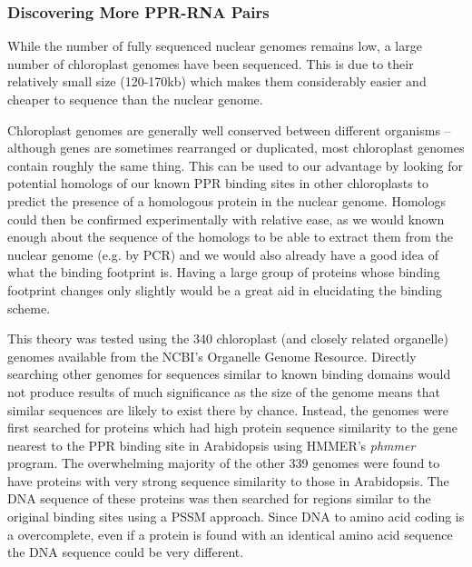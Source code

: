 \subsubsection{Discovering More PPR-RNA Pairs}

While the number of fully sequenced nuclear genomes remains low, a large 
number of chloroplast genomes have been sequenced.
This is due to their relatively small size (120-170kb) which makes them
considerably easier and cheaper to sequence than the nuclear genome.

Chloroplast genomes are generally well conserved between different organisms --
although genes are sometimes rearranged or duplicated, most chloroplast genomes
contain roughly the same thing.
This can be used to our advantage by looking for potential homologs of our known
PPR binding sites in other chloroplasts to predict the presence of a homologous
protein in the nuclear genome.
Homologs could then be confirmed experimentally with relative ease, as we would 
known enough about the sequence of the homologs to be able to extract them from 
the nuclear genome (e.g. by PCR) and we would also already have a good idea of 
what the binding footprint is.
Having a large group of proteins whose binding footprint changes only slightly
would be a great aid in elucidating the binding scheme.

This theory was tested using the 340 chloroplast (and closely related
organelle)
genomes available from the NCBI's Organelle Genome Resource.
Directly searching other genomes for sequences similar to known binding domains
would not produce results of much significance as the size of the genome means
that similar sequences are likely to exist there by chance.
Instead, the genomes were first searched for proteins which had high protein
sequence similarity to the gene nearest to the PPR binding site in Arabidopsis
using HMMER's \emph{phmmer} program.
The overwhelming majority of the other 339 genomes were found to have proteins 
with very strong sequence similarity to those in Arabidopsis. 
The DNA sequence of these proteins was then searched for regions similar to the
original binding sites using a PSSM approach.
Since DNA to amino acid coding is a overcomplete, even if a protein is found
with an identical amino acid sequence the DNA sequence could be very different.


